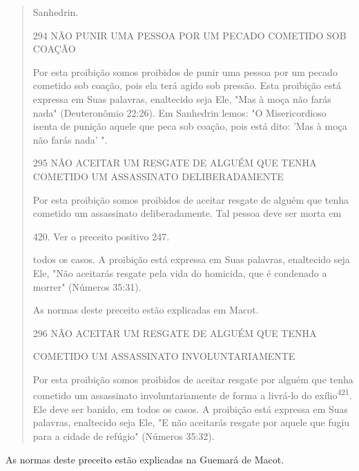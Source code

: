 \begin{quote}
Sanhedrin.

294 NÃO PUNIR UMA PESSOA POR UM PECADO COMETIDO SOB COAÇÃO

Por esta proibição somos proibidos de punir uma pessoa por um pe­cado
cometido sob coação, pois ela terá agido sob pressão. Esta proibição
está expressa em Suas palavras, enaltecido seja Ele, "Mas à moça não
farás nada" (Deuteronômio 22:26). Em Sanhedrin lemos: "O Misericordioso
isenta de pu­nição aquele que peca sob coação, pois está dito: 'Mas à
moça não farás nada' ".

295 NÃO ACEITAR UM RESGATE DE ALGUÉM QUE TENHA COMETIDO UM ASSASSINATO
DELIBERADAMENTE

Por esta proibição somos proibidos de aceitar resgate de alguém que
tenha cometido um assassinato deliberadamente. Tal pessoa deve ser morta
em

420. Ver o preceito positivo 247.

todos os casos. A proibição está expressa em Suas palavras, enaltecido
seja Ele, "Não aceitarás resgate pela vida do homicida, que é condenado
a morrer" (Nú­meros 35:31).

As normas deste preceito estão explicadas em Macot.

296 NÃO ACEITAR UM RESGATE DE ALGUÉM QUE TENHA

COMETIDO UM ASSASSINATO INVOLUNTARIAMENTE

Por esta proibição somos proibidos de aceitar resgate por alguém que
tenha cometido um assassinato involuntariamente de forma a livrá-lo do
exílio\textsuperscript{421}. Ele deve ser banido, em todos os casos. A
proibição está expressa em Suas palavras, enaltecido seja Ele, "E não
aceitarás resgate por aquele que fugiu para a cidade de refúgio"
(Números 35:32).
\end{quote}

As normas deste preceito estão explicadas na Guemará de Macot.

